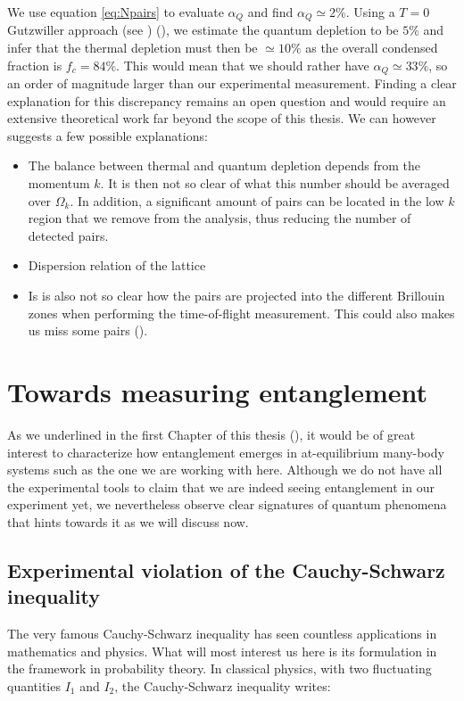 We use equation \ref{eq:Npairs} to evaluate $\alpha_Q$ and find $\alpha_Q \simeq 2 \%$. Using a $T=0$ Gutzwiller approach (see \cite{bouton_these}) (), we estimate the quantum depletion to be $5\%$ and infer that the thermal depletion must then be $\simeq 10\%$ as the overall condensed fraction is $f_c=84 \%$. This would mean that we should rather have $\alpha_Q \simeq 33 \%$, so an order of magnitude larger than our experimental measurement. Finding a clear explanation for this discrepancy remains an open question and would require an extensive theoretical work far beyond the scope of this thesis. We can however suggests a few possible explanations:

\begin{itemize}
    \item The balance between thermal and quantum depletion depends from the momentum $k$. It is then not so clear of what this number should be averaged over $\Omega_k$. In addition, a significant amount of \kmk pairs can be located in the low $k$ region that we remove from the analysis, thus reducing the number of detected pairs.
    \item Dispersion relation of the lattice 
    \item Is is also not so clear how the pairs are projected into the different Brillouin zones when performing the time-of-flight measurement. This could also makes us miss some pairs ().
\end{itemize}


\section{Towards measuring entanglement}

As we underlined in the first Chapter of this thesis (), it would be of great interest to characterize how entanglement emerges in at-equilibrium many-body systems such as the one we are working with here. Although we do not have all the experimental tools to claim that we are indeed seeing entanglement in our experiment yet, we nevertheless observe clear signatures of quantum phenomena that hints towards it as we will discuss now.

\subsection{Experimental violation of the Cauchy-Schwarz inequality}

The very famous Cauchy-Schwarz inequality has seen countless applications in mathematics and physics. What will most interest us here is its formulation in the framework in probability theory. In classical physics, with two fluctuating quantities $I_1$ and $I_2$, the Cauchy-Schwarz inequality writes:

